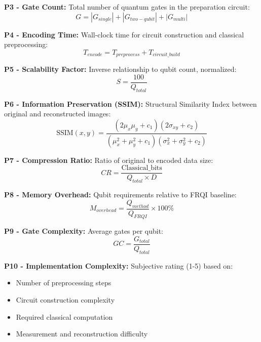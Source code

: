 \documentclass[11pt,a4paper]{article}
\begin{document}
\textbf{P3 - Gate Count:}
Total number of quantum gates in the preparation circuit:
\begin{equation}
G = |G_{single}| + |G_{two-qubit}| + |G_{multi}|
\label{eq:p3}
\end{equation}

\textbf{P4 - Encoding Time:}
Wall-clock time for circuit construction and classical preprocessing:
\begin{equation}
T_{encode} = T_{preprocess} + T_{circuit\_build}
\label{eq:p4}
\end{equation}

\textbf{P5 - Scalability Factor:}
Inverse relationship to qubit count, normalized:
\begin{equation}
S = \frac{100}{Q_{total}}
\label{eq:p5}
\end{equation}

\textbf{P6 - Information Preservation (SSIM):}
Structural Similarity Index between original and reconstructed images:
\begin{equation}
\text{SSIM}(x, y) = \frac{(2\mu_x\mu_y + c_1)(2\sigma_{xy} + c_2)}{(\mu_x^2 + \mu_y^2 + c_1)(\sigma_x^2 + \sigma_y^2 + c_2)}
\label{eq:p6}
\end{equation}

\textbf{P7 - Compression Ratio:}
Ratio of original to encoded data size:
\begin{equation}
CR = \frac{\text{Classical\_bits}}{Q_{total} \times D}
\label{eq:p7}
\end{equation}

\textbf{P8 - Memory Overhead:}
Qubit requirements relative to FRQI baseline:
\begin{equation}
M_{overhead} = \frac{Q_{method}}{Q_{FRQI}} \times 100\%
\label{eq:p8}
\end{equation}

\textbf{P9 - Gate Complexity:}
Average gates per qubit:
\begin{equation}
GC = \frac{G_{total}}{Q_{total}}
\label{eq:p9}
\end{equation}

\textbf{P10 - Implementation Complexity:}
Subjective rating (1-5) based on:
\begin{itemize}
    \item Number of preprocessing steps
    \item Circuit construction complexity
    \item Required classical computation
    \item Measurement and reconstruction difficulty
\end{itemize}
\end{document}
